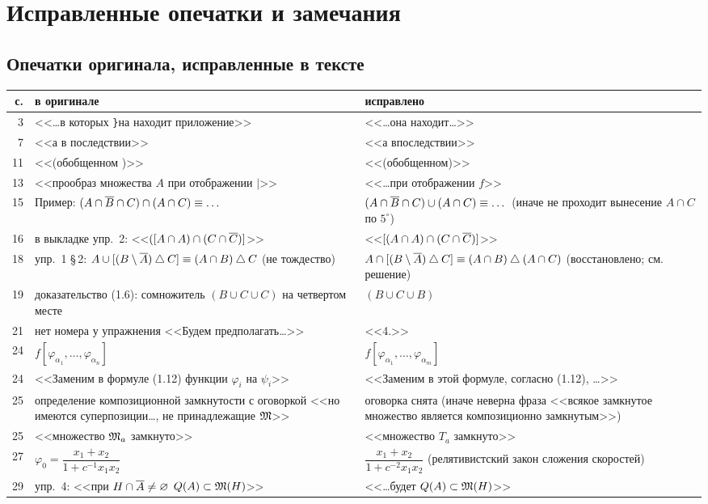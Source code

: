 \chapter{Исправленные опечатки и замечания}

\section*{Опечатки оригинала, исправленные в тексте}
\begin{center}\small
\begin{tabular}{@{}r p{} p{}@{}}
\toprule
с. & в оригинале & исправлено\\ \midrule
3 & <<\dots в которых \texttt{\}}на находит приложение>> & <<\dots она находит\dots>>\\
7 & <<а в последствии>> & <<а впоследствии>>\\
11 & <<(обобщенном )>> & <<(обобщенном)>>\\
13 & <<прообраз множества $A$ при отображении $|$>> & <<\dots при отображении $f$>>\\
15 & Пример: $(A\cap\overline{B}\cap C)\cap(A\cap C)\equiv\dots$ & $(A\cap\overline{B}\cap C)\cup(A\cap C)\equiv\dots$ (иначе не проходит вынесение $A\cap C$ по $5^\circ$)\\
16 & в выкладке упр.~2: <<$([A\cap A)\cap(C\cap\overline{C})]$>> & <<$[(A\cap A)\cap(C\cap\overline{C})]$>>\\
18 & упр.~1 \S\,2: $A\cup[(B\setminus\overline{A})\mathbin{\triangle} C]\equiv(A\cap B)\mathbin{\triangle} C$ (не тождество) & $A\cap[(B\setminus\overline{A})\mathbin{\triangle} C]\equiv(A\cap B)\mathbin{\triangle}(A\cap C)$ (восстановлено; см. решение)\\
19 & доказательство (1.6): сомножитель $(B\cup C\cup C)$ на четвертом месте & $(B\cup C\cup B)$\\
21 & нет номера у упражнения <<Будем предполагать\dots>> & <<4.>>\\
24 & $f[\varphi_{\alpha_1},\dots,\varphi_{\alpha_n}]$ & $f[\varphi_{\alpha_1},\dots,\varphi_{\alpha_m}]$\\
24 & <<Заменим в формуле (1.12) функции $\varphi_i$ на $\psi_i$>> & <<Заменим в этой формуле, согласно (1.12), \dots>>\\
25 & определение композиционной замкнутости с оговоркой <<но имеются суперпозиции\dots, не принадлежащие $\mathfrak M$>> & оговорка снята (иначе неверна фраза <<всякое замкнутое множество является композиционно замкнутым>>)\\
25 & <<множество $\mathfrak M_a$ замкнуто>> & <<множество $T_a$ замкнуто>>\\
27 & $\varphi_0=\dfrac{x_1+x_2}{1+c^{-1}x_1x_2}$ & $\dfrac{x_1+x_2}{1+c^{-2}x_1x_2}$ (релятивистский закон сложения скоростей)\\
29 & упр.~4: <<при $H\cap\overline{A}\ne\varnothing$ $Q(A)\subset\mathfrak M(H)$>> & <<\dots будет $Q(A)\subset\mathfrak M(H)$>>\\
\bottomrule
\end{tabular}
\end{center}

